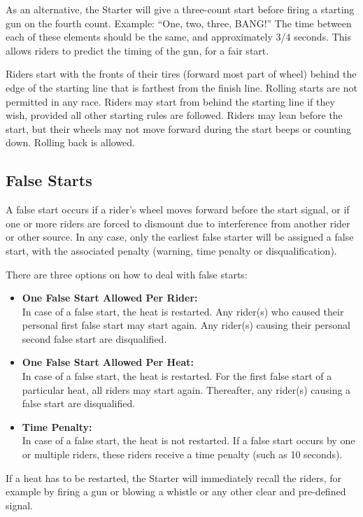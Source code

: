 As an alternative, the Starter will give a three-count start before firing a starting gun on the fourth count.
Example: ``One, two, three, BANG!''
The time between each of these elements should be the same, and approximately 3/4 seconds.
This allows riders to predict the timing of the gun, for a fair start.

Riders start with the fronts of their tires (forward most part of wheel) behind the edge of the starting line that is farthest from the finish line.
Rolling starts are not permitted in any race.
Riders may start from behind the starting line if they wish, provided all other starting rules are followed.
Riders may lean before the start, but their wheels may not move forward during the start beeps or counting down.
Rolling back is allowed.

\subsection{False Starts}

A false start occurs if a rider's wheel moves forward before the start signal, or if one or more riders are forced to dismount due to interference from another rider or other source.
In any case, only the earliest false starter will be assigned a false start, with the associated penalty (warning, time penalty or disqualification).

There are three options on how to deal with false starts:
\begin{itemize}
\item \textbf{One False Start Allowed Per Rider:}\\
In case of a false start, the heat is restarted.
Any rider(s) who caused their personal first false start may start again.
Any rider(s) causing their personal second false start are disqualified.
\item \textbf{One False Start Allowed Per Heat:}\\
In case of a false start, the heat is restarted.
For the first false start of a particular heat, all riders may start again.
Thereafter, any rider(s) causing a false start are disqualified.
\item \textbf{Time Penalty:}\\
In case of a false start, the heat is not restarted.
If a false start occurs by one or multiple riders, these riders receive a time penalty (such as 10 seconds).
\end{itemize}
If a heat has to be restarted, the Starter will immediately recall the riders, for example by firing a gun or blowing a whistle or any other clear and pre-defined signal.

